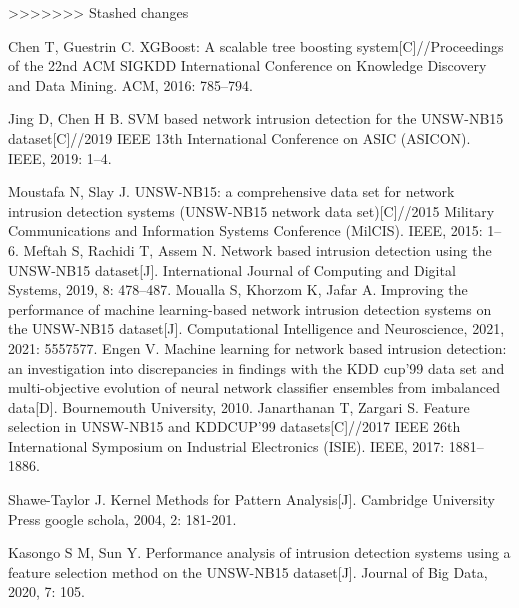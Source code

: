 \documentclass{article}
\begin{document}
>>>>>>> Stashed changes
\begin{thebibliography}{10}
  Chen T, Guestrin C. XGBoost: A scalable tree boosting system[C]//Proceedings of the 22nd ACM SIGKDD International Conference on Knowledge Discovery and Data Mining. ACM, 2016: 785–794.

  Jing D, Chen H B. SVM based network intrusion detection for the UNSW-NB15 dataset[C]//2019 IEEE 13th International Conference on ASIC (ASICON). IEEE, 2019: 1–4.

  Moustafa N, Slay J. UNSW-NB15: a comprehensive data set for network intrusion detection systems (UNSW-NB15 network data set)[C]//2015 Military Communications and Information Systems Conference (MilCIS). IEEE, 2015: 1–6.
  Meftah S, Rachidi T, Assem N. Network based intrusion detection using the UNSW-NB15 dataset[J]. International Journal of Computing and Digital Systems, 2019, 8: 478–487.
  Moualla S, Khorzom K, Jafar A. Improving the performance of machine learning-based network intrusion detection systems on the UNSW-NB15 dataset[J]. Computational Intelligence and Neuroscience, 2021, 2021: 5557577.
  Engen V. Machine learning for network based intrusion detection: an investigation into discrepancies in findings with the KDD cup'99 data set and multi-objective evolution of neural network classifier ensembles from imbalanced data[D]. Bournemouth University, 2010.
  Janarthanan T, Zargari S. Feature selection in UNSW-NB15 and KDDCUP'99 datasets[C]//2017 IEEE 26th International Symposium on Industrial Electronics (ISIE). IEEE, 2017: 1881–1886.
   
  Shawe-Taylor J. Kernel Methods for Pattern Analysis[J]. Cambridge University Press google schola, 2004, 2: 181-201.

  

  Kasongo S M, Sun Y. Performance analysis of intrusion detection systems using a feature selection method on the UNSW-NB15 dataset[J]. Journal of Big Data, 2020, 7: 105.
  



\end{thebibliography}

\end{document}

